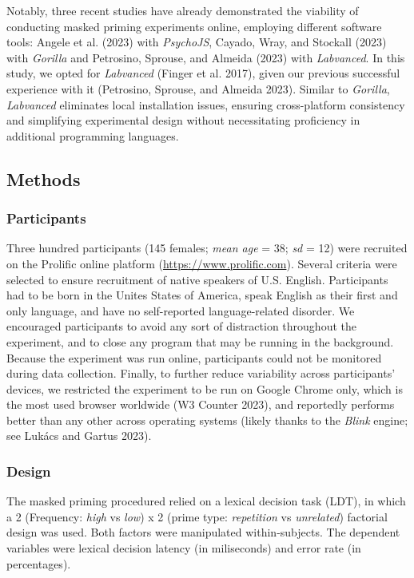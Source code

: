 \documentclass[
]{interact}
\begin{document}
Notably, three recent studies have already demonstrated the viability of
conducting masked priming experiments online, employing different
software tools: Angele et al. (2023) with \emph{PsychoJS}, Cayado, Wray,
and Stockall (2023) with \emph{Gorilla} and Petrosino, Sprouse, and
Almeida (2023) with \emph{Labvanced}. In this study, we opted for
\emph{Labvanced} (Finger et al. 2017), given our previous successful
experience with it (Petrosino, Sprouse, and Almeida 2023). Similar to
\emph{Gorilla}, \emph{Labvanced} eliminates local installation issues,
ensuring cross-platform consistency and simplifying experimental design
without necessitating proficiency in additional programming languages.

\subsection{Methods}\label{sec-exp1-methods}

\subsubsection{Participants}\label{sec-exp1-methods-participants}

Three hundred participants (145 females; \emph{mean age} = 38; \emph{sd}
= 12) were recruited on the Prolific online platform
(\url{https://www.prolific.com}). Several criteria were selected to
ensure recruitment of native speakers of U.S. English. Participants had
to be born in the Unites States of America, speak English as their first
and only language, and have no self-reported language-related disorder.
We encouraged participants to avoid any sort of distraction throughout
the experiment, and to close any program that may be running in the
background. Because the experiment was run online, participants could
not be monitored during data collection. Finally, to further reduce
variability across participants' devices, we restricted the experiment
to be run on Google Chrome only, which is the most used browser
worldwide (W3 Counter 2023), and reportedly performs better than any
other across operating systems (likely thanks to the \emph{Blink}
engine; see Lukács and Gartus 2023).

\subsubsection{Design}\label{sec-exp1-methods-design}

The masked priming procedured relied on a lexical decision task (LDT),
in which a 2 (Frequency: \emph{high} vs \emph{low}) x 2 (prime type:
\emph{repetition} vs \emph{unrelated}) factorial design was used. Both
factors were manipulated within-subjects. The dependent variables were
lexical decision latency (in miliseconds) and error rate (in
percentages).
\end{document}
